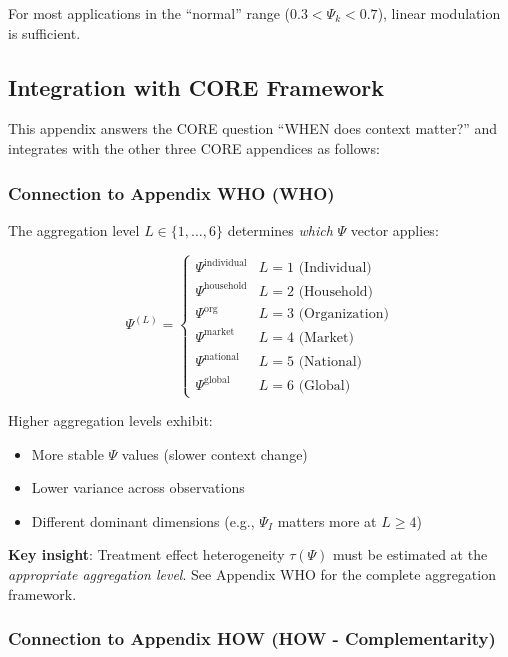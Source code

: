 For most applications in the ``normal'' range ($0.3 < \Psi_k < 0.7$), 
linear modulation is sufficient.



\subsection{Integration with CORE Framework}
\label{sec:V-core-integration}

This appendix answers the CORE question ``WHEN does context matter?'' and 
integrates with the other three CORE appendices as follows:

\subsubsection{Connection to Appendix WHO (WHO)}

The aggregation level $L \in \{1, \ldots, 6\}$ determines \textit{which} $\Psi$ 
vector applies:

\begin{equation}
\Psi^{(L)} = \begin{cases}
\Psi^{\text{individual}} & L = 1 \text{ (Individual)} \\
\Psi^{\text{household}} & L = 2 \text{ (Household)} \\
\Psi^{\text{org}} & L = 3 \text{ (Organization)} \\
\Psi^{\text{market}} & L = 4 \text{ (Market)} \\
\Psi^{\text{national}} & L = 5 \text{ (National)} \\
\Psi^{\text{global}} & L = 6 \text{ (Global)}
\end{cases}
\end{equation}

Higher aggregation levels exhibit:
\begin{itemize}
    \item More stable $\Psi$ values (slower context change)
    \item Lower variance across observations
    \item Different dominant dimensions (e.g., $\Psi_I$ matters more at $L \geq 4$)
\end{itemize}

\textbf{Key insight}: Treatment effect heterogeneity $\tau(\Psi)$ must be estimated 
at the \textit{appropriate aggregation level}. See Appendix WHO for the complete 
aggregation framework.

\subsubsection{Connection to Appendix HOW (HOW - Complementarity)}

